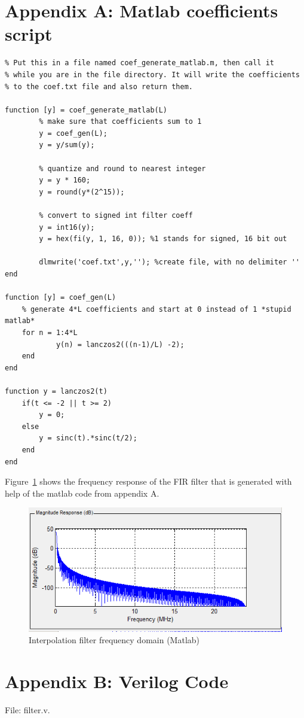 \documentclass[a4paper,twoside,11pt, fleqn]{article}
\begin{document}
\section{Appendix A: Matlab coefficients script}
\begin{lstlisting}
% Put this in a file named coef_generate_matlab.m, then call it 
% while you are in the file directory. It will write the coefficients
% to the coef.txt file and also return them.

function [y] = coef_generate_matlab(L)
        % make sure that coefficients sum to 1
        y = coef_gen(L);
        y = y/sum(y);

        % quantize and round to nearest integer
        y = y * 160;
        y = round(y*(2^15)); 
             
        % convert to signed int filter coeff
        y = int16(y);
        y = hex(fi(y, 1, 16, 0)); %1 stands for signed, 16 bit out
        
        dlmwrite('coef.txt',y,''); %create file, with no delimiter ''      
end

function [y] = coef_gen(L)
    % generate 4*L coefficients and start at 0 instead of 1 *stupid matlab*
    for n = 1:4*L
            y(n) = lanczos2(((n-1)/L) -2);
    end
end

function y = lanczos2(t)
    if(t <= -2 || t >= 2)
        y = 0;
    else
        y = sinc(t).*sinc(t/2);
    end
end
\end{lstlisting}

Figure~\ref{fig:frq} shows the frequency response of the FIR filter that is generated with help of the matlab code from appendix A.

\begin{figure}[h]
	\includegraphics[scale=0.67]{Images/frequencyplot}
    \caption{Interpolation filter frequency domain (Matlab)}
    \label{fig:frq}
\end{figure}

\newpage
\section{Appendix B: Verilog Code}
File: filter.v.
\begin{lstlisting}[language=Verilog]

\end{lstlisting}
\end{document}
